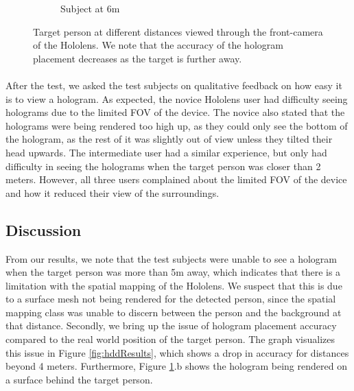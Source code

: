 \begin{figure}[ht]
\begin{subfigure}[b]{.32\textwidth}
        \caption{Subject at 6m}
    \end{subfigure}
    \vspace{-1\baselineskip}
    \begin{center}
        \caption{Target person at different distances viewed through the front-camera of the Hololens. We note that the accuracy of the hologram placement decreases as the target is further away.}
        \label{fig:marek}
    \end{center}
    \vspace{-2\baselineskip}
\end{figure}

\paragraph{} After the test, we asked the test subjects on qualitative feedback on how easy it is to view a hologram. As expected, the novice Hololens user had difficulty seeing holograms due to the limited FOV of the device. The novice also stated that the holograms were being rendered too high up, as they could only see the bottom of the hologram, as the rest of it was slightly out of view unless they tilted their head upwards. The intermediate user had a similar experience, but only had difficulty in seeing the holograms when the target person was closer than 2 meters. However, all three users complained about the limited FOV of the device and how it reduced their view of the surroundings.

\subsection{Discussion} \label{sec:distanceDiscussion}
From our results, we note that the test subjects were unable to see a hologram when the target person was more than 5m away, which indicates that there is a limitation with the spatial mapping of the Hololens. We suspect that this is due to a surface mesh not being rendered for the detected person, since the spatial mapping class was unable to discern between the person and the background at that distance. Secondly, we bring up the issue of hologram placement accuracy compared to the real world position of the target person. The graph visualizes this issue in Figure \ref{fig:hddResults}, which shows a drop in accuracy for distances beyond 4 meters. Furthermore, Figure \ref{fig:marek}.b shows the hologram being rendered on a surface behind the target person.

